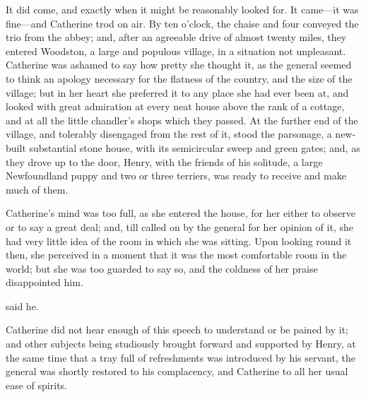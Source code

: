 It did come, and exactly when it might be reasonably looked for. It came---it was fine---and Catherine trod on air. By ten o'clock, the chaise and four conveyed the trio from the abbey; and, after an agreeable drive of almost twenty miles, they entered Woodston, a large and populous village, in a situation not unpleasant. Catherine was ashamed to say how pretty she thought it, as the general seemed to think an apology necessary for the flatness of the country, and the size of the village; but in her heart she preferred it to any place she had ever been at, and looked with great admiration at every neat house above the rank of a cottage, and at all the little chandler's shops which they passed. At the further end of the village, and tolerably disengaged from the rest of it, stood the parsonage, a new-built substantial stone house, with its semicircular sweep and green gates; and, as they drove up to the door, Henry, with the friends of his solitude, a large Newfoundland puppy and two or three terriers, was ready to receive and make much of them.

Catherine's mind was too full, as she entered the house, for her either to observe or to say a great deal; and, till called on by the general for her opinion of it, she had very little idea of the room in which she was sitting. Upon looking round it then, she perceived in a moment that it was the most comfortable room in the world; but she was too guarded to say so, and the coldness of her praise disappointed him.

 said he. 

Catherine did not hear enough of this speech to understand or be pained by it; and other subjects being studiously brought forward and supported by Henry, at the same time that a tray full of refreshments was introduced by his servant, the general was shortly restored to his complacency, and Catherine to all her usual ease of spirits.

